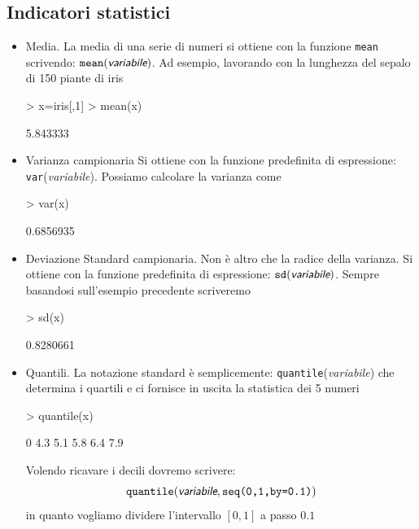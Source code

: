 \documentclass[onecolumn,12pt]{book}
\newcommand{\varia}[1]{\textsl{\textsf{#1}}}
\begin{document}
\subsection{Indicatori statistici}
\begin{itemize}
\item{}Media.\vskip0pt
La media di una serie di numeri si ottiene con la funzione \texttt{mean} scrivendo:
$\texttt{mean}(\varia{variabile})$.
Ad esempio, lavorando con la lunghezza del sepalo di 150 piante di iris
\begin{Schunk}
\begin{Sinput}
> x=iris[,1]
> mean(x)
\end{Sinput}
\begin{Soutput}
[1] 5.843333
\end{Soutput}
\end{Schunk}
\item{}Varianza campionaria\vskip0pt
Si ottiene con la funzione predefinita di espressione:
\texttt{var}(\varia{variabile}).
Possiamo calcolare la varianza come
\begin{Schunk}
\begin{Sinput}
> var(x)
\end{Sinput}
\begin{Soutput}
[1] 0.6856935
\end{Soutput}
\end{Schunk}
\item{}Deviazione Standard campionaria.\vskip0pt
Non \`e altro che la radice della varianza. Si ottiene con la funzione predefinita di espressione:
$\texttt{sd}(\varia{variabile})$.
Sempre basandosi sull'esempio precedente scriveremo
\begin{Schunk}
\begin{Sinput}
> sd(x)
\end{Sinput}
\begin{Soutput}
[1] 0.8280661
\end{Soutput}
\end{Schunk}

\item{}Quantili. La notazione standard \`e semplicemente: \texttt{quantile}(\varia{variabile}) che determina i quartili e ci fornisce in uscita la statistica dei 5 numeri

\begin{Schunk}
\begin{Sinput}
> quantile(x)
\end{Sinput}
\begin{Soutput}
  0%
 4.3  5.1  5.8  6.4  7.9 
\end{Soutput}
\end{Schunk}
 Volendo ricavare i decili dovremo scrivere:
$$\texttt{quantile}(\varia{variabile},\texttt{seq(0,1,by=0.1)})$$
in quanto vogliamo dividere l'intervallo $[0,1]$ a passo $0.1$


\end{itemize}
\end{document}
